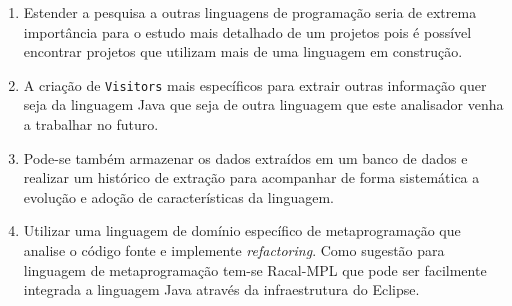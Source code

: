 \begin{enumerate}
	\item Estender a pesquisa a outras linguagens de programa\c{c}\~{a}o seria de extrema import\^{a}ncia para o estudo mais detalhado de um projetos pois \'{e} poss\'{i}vel encontrar projetos que utilizam mais de uma linguagem em constru\c{c}\~{a}o.

	\item A cria\c{c}\~{a}o de \texttt{Visitors} mais espec\'{i}ficos para extrair outras informa\c{c}\~{a}o quer seja da linguagem Java que seja de outra linguagem que este analisador venha a trabalhar no futuro.

	\item Pode-se tamb\'{e}m armazenar os dados extra\'{i}dos em um banco de dados e realizar um hist\'{o}rico de extra\c{c}\~{a}o para acompanhar de forma sistem\'{a}tica a evolu\c{c}\~{a}o e ado\c{c}\~{a}o de caracter\'{i}sticas da linguagem.

	\item Utilizar uma linguagem de dom\'{i}nio espec\'{i}fico de metaprograma\c{c}\~{a}o que analise o c\'{o}digo fonte e implemente \textit{refactoring}. Como sugest\~{a}o para linguagem de metaprograma\c{c}\~{a}o tem-se Racal-MPL que pode ser facilmente integrada a linguagem Java atrav\'{e}s da infraestrutura do Eclipse.

\end{enumerate}







